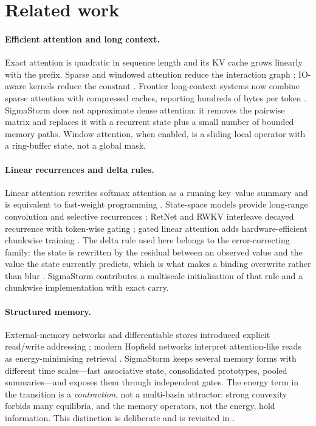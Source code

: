 \section{Related work}

\paragraph{Efficient attention and long context.}
Exact attention is quadratic in sequence length and its KV cache grows linearly with the
prefix. Sparse and windowed attention reduce the interaction graph
\citep{beltagy2020longformer,zaheer2020bigbird}; IO-aware kernels reduce the constant
\citep{dao2022flashattention}. Frontier long-context systems now combine sparse attention with
compressed caches, reporting hundreds of bytes per token \citep{deepseek2026,kimi2026}.
SigmaStorm does not approximate dense attention: it removes the pairwise matrix and replaces
it with a recurrent state plus a small number of bounded memory paths. Window attention, when
enabled, is a sliding local operator with a ring-buffer state, not a global mask.

\paragraph{Linear recurrences and delta rules.}
Linear attention rewrites softmax attention as a running key--value summary
\citep{katharopoulos2020transformers} and is equivalent to fast-weight programming
\citep{schlag2021linear}. State-space models provide long-range convolution and selective
recurrences \citep{gu2022s4,gu2024mamba}; RetNet and RWKV interleave decayed recurrence with
token-wise gating \citep{sun2023retnet,peng2023rwkv}; gated linear attention adds
hardware-efficient chunkwise training \citep{yang2024gla}. The delta rule used here belongs to
the error-correcting family: the state is rewritten by the residual between an observed value
and the value the state currently predicts, which is what makes a binding overwrite rather
than blur \citep{yang2024gateddeltanet}. SigmaStorm contributes a multiscale initialisation of
that rule and a chunkwise implementation with exact carry.

\paragraph{Structured memory.}
External-memory networks and differentiable stores introduced explicit read/write addressing
\citep{graves2014neural}; modern Hopfield networks interpret attention-like reads as
energy-minimising retrieval \citep{ramsauer2021hopfield}. SigmaStorm keeps several memory
forms with different time scales---fast associative state, consolidated prototypes, pooled
summaries---and exposes them through independent gates. The energy term in the transition is a
\emph{contraction}, not a multi-basin attractor: strong convexity forbids many equilibria, and
the memory operators, not the energy, hold information. This distinction is deliberate and is
revisited in .


